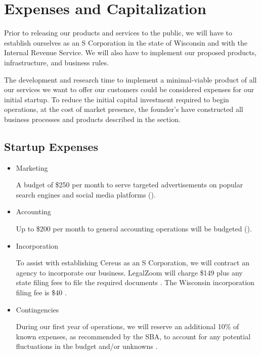 {\let\cleardoublepage\relax \chapter*{Expenses and Capitalization}}

Prior to releasing our products and services to the public, we will have to establish ourselves as an S Corporation in the state of Wisconsin and with the Internal Revenue Service. We will also have to implement our proposed products, infrastructure, and business rules.

The development and research time to implement a minimal-viable product of all our services we want to offer our customers could be considered expenses for our initial startup. To reduce the initial capital investment required to begin operations, at the cost of market presence, the founder's have constructed all business processes and products described in the  section.

\section{Startup Expenses} \label {startup.exp}

\begin{itemize}

\item Marketing

A budget of \$250 per month to serve targeted advertisements on popular search engines and social media platforms ().

\item Accounting

Up to \$200 per month to general accounting operations will be budgeted (). 

\item Incorporation

To assist with establishing Cereus as an S Corporation, we will contract an agency to incorporate our business. LegalZoom will charge \$149 plus any state filing fees to file the required documents \cite{legalzoom.2020}. The Wisconsin incorporation filing fee is \$40 \cite{wi.2018}.

\item Contingencies

During our first year of operations, we will reserve an additional 10\% of known expenses, as recommended by the SBA, to account for any potential fluctuations in the budget and/or unknowns \cite{sba.2020}.

\end{itemize}

